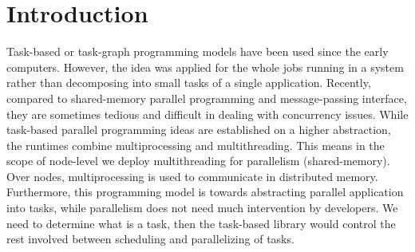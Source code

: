 
\section{Introduction} \label{sec:intro}

Task-based or task-graph programming models have been used since the early computers. However, the idea was applied for the whole jobs running in a system rather than decomposing into small tasks of a single application. Recently, compared to shared-memory parallel programming and message-passing interface, they are sometimes tedious and difficult in dealing with concurrency issues. While task-based parallel programming ideas are established on a higher abstraction, the runtimes combine multiprocessing and multithreading. This means in the scope of node-level we deploy multithreading for parallelism (shared-memory). Over nodes, multiprocessing is used to communicate in distributed memory. Furthermore, this programming model is towards abstracting parallel application into tasks, while parallelism does not need much intervention by developers. We need to determine what is a task, then the task-based library would control the rest involved between scheduling and parallelizing of tasks.
